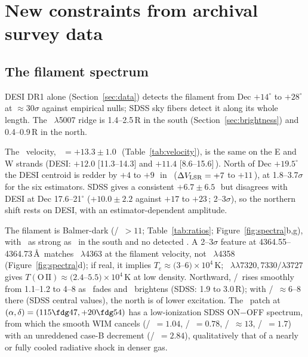 \section{New constraints from archival survey data}\label{sec:new}

\subsection{The filament spectrum}\label{sec:spectrum}

DESI DR1 alone (Section~\ref{sec:data}) detects the filament from Dec $+14^{\circ}$ to $+28^{\circ}$ at $\approx30\sigma$ against empirical nulls; SDSS sky fibers detect it along its whole length. The \Oiii~$\lambda$5007 ridge is 1.4--2.5\,R in the south (Section~\ref{sec:brightness}) and 0.4--0.9\,R in the north.

The \Oiii\ velocity, \vhel\ $=+13.3\pm1.0$\,\kms\ (Table~\ref{tab:velocity}), is the same on the E and W strands (DESI: $+12.0$ [11.3--14.3] and $+11.4$ [8.6--15.6]\,\kms). North of Dec $+19.5^{\circ}$ the DESI centroid is redder by $+4$ to $+9$\,\kms\ in \vhel\ ($\Delta V_{\rm LSR}=+7$ to $+11$\,\kms), at 1.8--3.7$\sigma$ for the six estimators. SDSS gives a consistent $+6.7\pm6.5$\,\kms\ but disagrees with DESI at Dec 17.6--21$^{\circ}$ ($+10.0\pm2.2$ against $+17$ to $+23$\,\kms; 2--3$\sigma$), so the northern shift rests on DESI, with an estimator-dependent amplitude.

The filament is Balmer-dark (\Oiii/\Hb\ $>11$; Table~\ref{tab:ratios}; Figure~\ref{fig:spectra}b,g), with \Oii\ as strong as \Oiii\ in the south and no detected . A 2--3$\sigma$ feature at 4364.55--4364.73\,\AA\ matches \Oiii~$\lambda$4363 at the filament velocity, not ~$\lambda$4358 (Figure~\ref{fig:spectra}d); if real, it implies $T_e\approx(3$--$6)\times10^4$\,K; \Oii~$\lambda\lambda7320,7330/\lambda3727$ gives $T(\mathrm{O\,II})\approx(2.4$--$5.5)\times10^4$\,K at low density. Northward, \Oii/\Oiii\ rises smoothly from 1.1--1.2 to 4--8 as \Oiii\ fades and \Oii\ brightens (SDSS: 1.9 to 3.0\,R); with \Oiii/\Hb\ $\approx6$--8 there (SDSS central values), the north is of lower excitation. The \Ha\ patch at $(\alpha,\delta)=(115\fdg47,+20\fdg54)$ has a low-ionization SDSS ON$-$OFF spectrum, from which the smooth WIM cancels (\Sii/\Ha\ $=1.04$, \Nii/\Ha\ $=0.78$, \Oii/\Hb\ $\approx13$, \Oiii/\Hb\ $=1.7$) with an unreddened case-B decrement (\Ha/\Hb\ $=2.84$), qualitatively that of a nearly or fully cooled radiative shock in denser gas.

